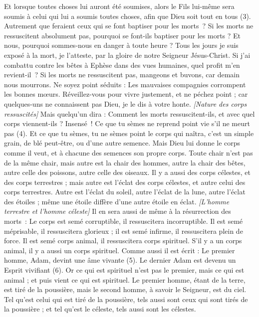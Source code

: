 \begin{multicols}{2}
Et lorsque toutes choses lui auront été soumises, alors le Fils lui-même sera soumis à celui qui lui a soumis toutes choses, afin que Dieu soit tout en tous (3).
Autrement que feraient ceux qui se font baptiser pour les morts ? Si les morts ne ressuscitent absolument pas, pourquoi se font-ils baptiser pour les morts ?
Et nous, pourquoi sommes-nous en danger à toute heure ?
Tous les jours je suis exposé à la mort, je l’atteste, par la gloire de notre Seigneur Jésus-Christ.
Si j'ai combattu contre les bêtes à Ephèse dans des vues humaines, quel profit m’en revient-il ? Si les morts ne ressuscitent pas, mangeons et buvons, car demain nous mourrons.
Ne soyez point séduits : Les mauvaises compagnies corrompent les bonnes mœurs.
Réveillez-vous pour vivre justement, et ne péchez point ; car quelques-uns ne connaissent pas Dieu, je le dis à votre honte.
\textit{[Nature des corps ressuscités]}
Mais quelqu'un dira : Comment les morts ressuscitent-ils, et avec quel corps viennent-ils ?
Insensé ! Ce que tu sèmes ne reprend point vie s'il ne meurt pas (4).
Et ce que tu sèmes, tu ne sèmes point le corps qui naîtra, c’est un simple grain, de blé peut-être, ou d’une autre semence.
Mais Dieu lui donne le corps comme il veut, et à chacune des semences son propre corps.
Toute chair n'est pas de la même chair, mais autre est la chair des hommes, autre la chair des bêtes, autre celle des poissons, autre celle des oiseaux.
Il y a aussi des corps célestes, et des corps terrestres ; mais autre est l’éclat des corps célestes, et autre celui des corps terrestres.
Autre est l’éclat du soleil, autre l’éclat de la lune, autre l’éclat des étoiles ; même une étoile diffère d'une autre étoile en éclat.
\textit{[L'homme terrestre et l'homme céleste]}
Il en sera aussi de même à la résurrection des morts : Le corps est semé corruptible, il ressuscitera incorruptible.
Il est semé méprisable, il ressuscitera glorieux ; il est semé infirme, il ressuscitera plein de force.
Il est semé corps animal, il ressuscitera corps spirituel. S’il y a un corps animal, il y a aussi un corps spirituel.
Comme aussi il est écrit : Le premier homme, Adam, devint une âme vivante (5). Le dernier Adam est devenu un Esprit vivifiant (6).
Or ce qui est spirituel n'est pas le premier, mais ce qui est animal ; et puis vient ce qui est spirituel.
Le premier homme, étant de la terre, est tiré de la poussière, mais le second homme, à savoir le Seigneur, est du ciel.
Tel qu'est celui qui est tiré de la poussière, tels aussi sont ceux qui sont tirés de la poussière ; et tel qu'est le céleste, tels aussi sont les célestes.

\end{multicols}
